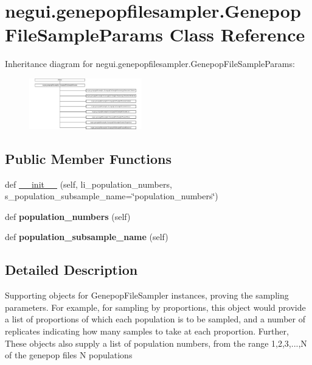 \hypertarget{classnegui_1_1genepopfilesampler_1_1GenepopFileSampleParams}{}\section{negui.\+genepopfilesampler.\+Genepop\+File\+Sample\+Params Class Reference}
\label{classnegui_1_1genepopfilesampler_1_1GenepopFileSampleParams}
Inheritance diagram for negui.\+genepopfilesampler.\+Genepop\+File\+Sample\+Params\+:\begin{figure}[H]
\begin{center}
\leavevmode
\includegraphics[height=2.193212cm]{classnegui_1_1genepopfilesampler_1_1GenepopFileSampleParams}
\end{center}
\end{figure}
\subsection*{Public Member Functions}
\begin{DoxyCompactItemize}
\item 
def \hyperlink{classnegui_1_1genepopfilesampler_1_1GenepopFileSampleParams_adb4c66f2bffa0a2eca84ed3dd3bc6385}{\+\_\+\+\_\+init\+\_\+\+\_\+} (self, li\+\_\+population\+\_\+numbers, s\+\_\+population\+\_\+subsample\+\_\+name=\char`\"{}population\+\_\+numbers\char`\"{})
\item 
def {\bfseries population\+\_\+numbers} (self)\hypertarget{classnegui_1_1genepopfilesampler_1_1GenepopFileSampleParams_a5ecc667eef35a832923e5c4ce659cfe7}{}\label{classnegui_1_1genepopfilesampler_1_1GenepopFileSampleParams_a5ecc667eef35a832923e5c4ce659cfe7}

\item 
def {\bfseries population\+\_\+subsample\+\_\+name} (self)\hypertarget{classnegui_1_1genepopfilesampler_1_1GenepopFileSampleParams_ab3ae1c545edd5230e6c37db9507d0535}{}\label{classnegui_1_1genepopfilesampler_1_1GenepopFileSampleParams_ab3ae1c545edd5230e6c37db9507d0535}

\end{DoxyCompactItemize}


\subsection{Detailed Description}
\begin{DoxyVerb}Supporting objects for GenepopFileSampler instances,
proving the sampling parameters.  For example, for 
sampling by proportions, this object would provide
a list of proportions of which each population is to 
be sampled, and a number of replicates indicating how
many samples to take at each proportion.  Further,
These objects also supply a list of population numbers,
from the range 1,2,3,...,N of the genepop files N
populations
\end{DoxyVerb}
 

